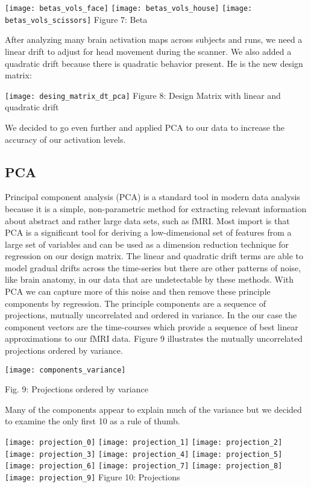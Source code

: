 \documentclass[12pt]{article}
\begin{document}
    \centering
      \texttt{[image: betas\_vols\_face]}
      \texttt{[image: betas\_vols\_house]}
      \texttt{[image: betas\_vols\_scissors]}
Figure 7: Beta



After analyzing many brain activation maps across subjects and runs, we need a linear drift to adjust for head movement during the scanner. We also added a quadratic drift because there is quadratic behavior present. He is the new design matrix:

    \centering
      \texttt{[image: desing\_matrix\_dt\_pca]}
Figure 8: Design Matrix with linear and quadratic drift


We decided to go even further and applied PCA to our data to increase the accuracy of our activation levels. 

\subsection{PCA}
Principal component analysis (PCA) is a standard tool in modern data analysis 
because it is a simple, non-parametric method for extracting relevant 
information about abstract and rather large data sets, such as fMRI.  Most 
import is that PCA is a significant tool for deriving a low-dimensional set of 
features from a large set of variables and can be used as a dimension reduction 
technique for regression on our design matrix. The linear and quadratic drift 
terms are able to model gradual drifts across the time-series but there are 
other patterns of noise, like brain anatomy, in our data that are undetectable 
by these methods. With PCA we can capture more of this noise and then remove 
these principle components by regression. The principle components are a 
sequence of projections, mutually uncorrelated and ordered in variance. In the 
our case the component vectors are the time-courses which provide a sequence of 
best linear approximations to our fMRI data.  Figure 9 illustrates the mutually 
uncorrelated projections ordered by variance.


    \centering
      \texttt{[image: components\_variance]}


Fig. 9: Projections ordered by variance

Many of the  components appear to explain much of the variance but we decided 
to examine the only first 10 as a rule of thumb.


    \centering
      \texttt{[image: projection\_0]}
      \texttt{[image: projection\_1]}
      \texttt{[image: projection\_2]}
      \texttt{[image: projection\_3]}
      \texttt{[image: projection\_4]}
      \texttt{[image: projection\_5]}
      \texttt{[image: projection\_6]}
      \texttt{[image: projection\_7]}
      \texttt{[image: projection\_8]}
      \texttt{[image: projection\_9]}
Figure 10: Projections
\end{document}
